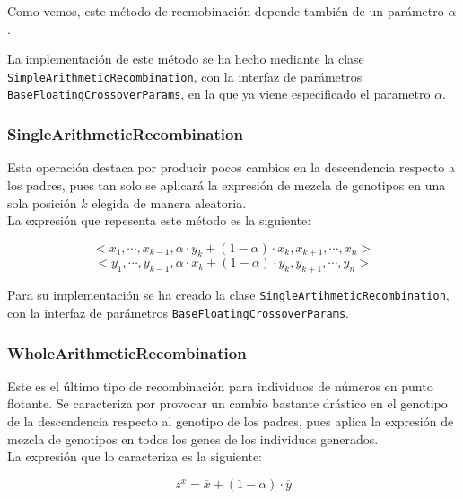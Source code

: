 Como vemos, este método de recmobinación depende también de un parámetro $\alpha$. 

La implementación de este método se ha hecho mediante la clase \texttt{SimpleArithmeticRecombination}, con la interfaz de parámetros \texttt{BaseFloatingCrossoverParams}, en la que ya viene especificado el parametro $\alpha$.

\subsubsection{SingleArithmeticRecombination}

Esta operación destaca por producir pocos cambios en la descendencia respecto a los padres, pues tan solo se aplicará la expresión de mezcla de genotipos en una sola posición $k$ elegida de manera aleatoria. \\

La expresión que repesenta este método es la siguiente:

\begin{equation}
    <x_1, \cdots ,x_{k−1}, \alpha \cdot y_k + (1 - \alpha) \cdot x_k, x_{k+1}, \cdots ,x_n >
\end{equation}
\begin{equation}
    <y_1, \cdots ,y_{k−1}, \alpha \cdot x_k + (1 - \alpha) \cdot y_k, y_{k+1}, \cdots ,y_n >
\end{equation}

Para su implementación se ha creado la clase \texttt{SingleArtihmeticRecombination}, con la interfaz de parámetros \texttt{BaseFloatingCrossoverParams}.

\subsubsection{WholeArithmeticRecombination}

Este es el último tipo de recombinación para individuos de números en punto flotante. Se caracteriza por provocar un cambio bastante drástico en el genotipo de la descendencia respecto al genotipo de los padres, pues aplica la expresión de mezcla de genotipos en todos los genes de los individuos generados. \\

La expresión que lo caracteriza es la siguiente:

\begin{equation}
    z^x = \overline{x} + (1 - \alpha) \cdot \overline{y}
\end{equation}

